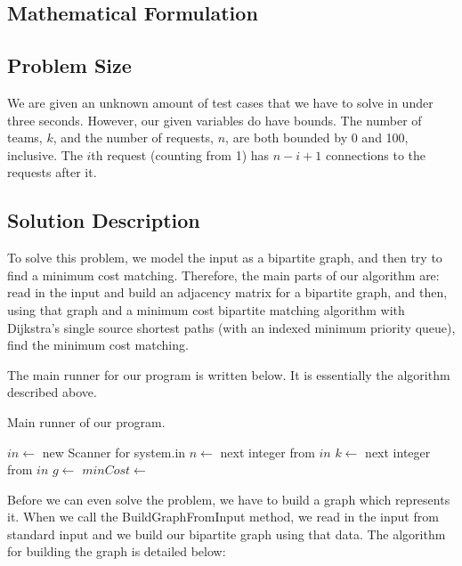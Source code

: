 \documentclass[12pt]{article}
\begin{document}
\subsection{Mathematical Formulation}

\subsection{Problem Size}

We are given an unknown amount of test cases that we have to solve in under
three seconds. However, our given variables do have bounds. The number
of teams, $k$, and the number of requests, $n$, are both bounded by
0 and 100, inclusive. The $i$th request (counting from 1) has $n - i + 1$
connections to the requests after it.

\subsection{Solution Description}

To solve this problem, we model the input as a bipartite graph, and
then try to find a minimum cost matching. Therefore, the main parts
of our algorithm are: read in the input and build an adjacency matrix
for a bipartite graph, and then, using that graph and a minimum
cost bipartite matching algorithm with Dijkstra's single source
shortest paths (with an indexed minimum priority queue), find the
minimum cost matching.

The main runner for our program is written below. It is essentially
the algorithm described above.

\begin{algorithm}[H]
\caption{Main runner of our program.}
\begin{algorithmic}
        \State $in \gets$ new Scanner for system.in
            \State $n \gets$ next integer from $in$
            \State $k \gets$ next integer from $in$
            \State $g \gets$ 
            \State $minCost \gets$ 
            \State {}
        \EndWhile
    \EndProcedure
\end{algorithmic}
\end{algorithm}

Before we can even solve the problem, we have to build a graph which
represents it. When we call the {\sc BuildGraphFromInput} method,
we read in the input from standard input and we build our bipartite
graph using that data. The algorithm for building the graph is
detailed below:
\end{document}
